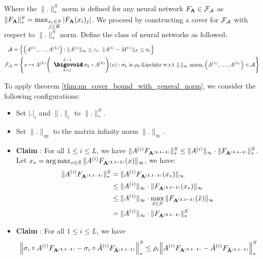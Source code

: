 \noindent Where the $\|.\|_*^S$ norm is defined for any neural network $F_{\bf A}\in\mathcal{F}_\mathcal{A}$ as $\|F_{\bf A}\|_*^S = \max_{\substack{x_i\in S \\ j \le K}} |F_{\bf A}(x_i)_j|$. We proceed by constructing a cover for $\mathcal{F}_\mathcal{A}$ with respect to $\|.\|_*^S$ norm. Define the class of neural networks as followed:
\begin{align*}
    \mathcal{A} &= \bigCurl{
        \bigRound{\A{1}, \dots, \A{L}} : \|\A{i}\|_\infty \le c_i, \ \|\A{i} - \M{i}\|_F \le a_i
    }\\
    \F_\mathcal{A} &= \biggCurl{
        x \mapsto \A{L}\biggRound{
            \bigO_{k=1}^{L-1}\sigma_k\circ \A{k} 
        }(x) : \sigma_k \text{ is $\rho_k$-Lipchitz w.r.t $\|.\|_\infty$ norm}, \bigRound{\A{1}, \dots, \A{L}}\in\mathcal{A}
    }
\end{align*} 


\noindent To apply theorem \ref{thm:nn_cover_bound_with_general_norm}, we consider the following configurations:
\begin{itemize}
    \item Set $|.|_i$ and $\|.\|_i$ to $\|.\|_*^S$.
    \item Set $\|.\|_{op}$ to the matrix infinity norm $\|.\|_\infty$.
    \item \textbf{Claim} : For all $1\le i\le L$, we have $\|A^{(i)}F_{\bf A^{(1, i-1)}}\|_*^S \le \|A^{(i)}\|_\infty \cdot \|F_{\bf A^{(1, i-1)}}\|_*^S$.
    \newline Let $x_* = \arg\max_{x\in S}\|A^{(i)}F_{\bf A^{(1, i-1)}}(x)\|_\infty$, we have:
    \begin{align*}
        \|A^{(i)}F_{\bf A^{(1, i-1)}}\|_*^S &= \|A^{(i)}F_{\bf A^{(1, i-1)}}(x_*)\|_\infty \\
            &\le \|A^{(i)}\|_\infty \cdot \|F_{\bf A^{(1, i-1)}}(x_*)\|_\infty \\
            &\le \|A^{(i)}\|_\infty \cdot \max_{\tilde x\in S}\|F_{\bf A^{(1, i-1)}}(\tilde x)\|_\infty \\
            &= \|A^{(i)}\|_\infty \cdot \|F_{\bf A^{(1, i-1)}}\|_*^S
    \end{align*}

    \item \textbf{Claim} : For all $1\le i \le L$, we have
    \begin{align*}
        \Big\|
            \sigma_i\circ A^{(i)}F_{\bf A^{(1, i-1)}} - \sigma_i \circ {\bar A}^{(i)}F_{\bf {\bar A}^{(1, i-1)}}
        \Big\|_*^S \le \rho_i\Big\|
            A^{(i)}F_{\bf A^{(1, i-1)}} - {\bar A}^{(i)}F_{\bf {\bar A}^{(1, i-1)}} 
        \Big\|_*^S
    \end{align*}
\end{itemize}


